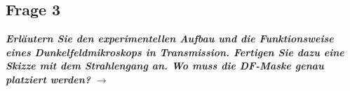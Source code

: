\subsection{\label{subsec:FZV3}Frage 3}
\textbf{\textit{Erläutern Sie den experimentellen Aufbau und die Funktionsweise eines Dunkelfeldmikroskops
in Transmission. Fertigen Sie dazu eine Skizze mit dem Strahlengang an. 
Wo muss die DF-Maske genau platziert werden?}}
$\rightarrow$